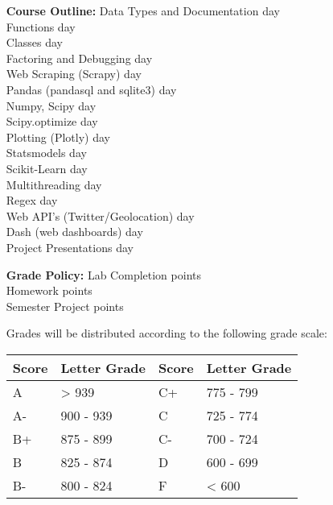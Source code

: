\documentclass[12pt, margin=.5in]{article}
\begin{document}
\begin{itemize}
\vspace*{.15in}
\item[\textbf{Course Outline:}]
Data Types and Documentation  day\\
Functions  day\\
Classes  day\\
Factoring and Debugging  day\\
Web Scraping (Scrapy)  day\\
Pandas (pandasql and sqlite3)  day\\
Numpy, Scipy  day\\
Scipy.optimize  day\\
Plotting (Plotly)  day\\
Statsmodels  day\\
Scikit-Learn  day\\
Multithreading  day\\
Regex  day\\
Web API's (Twitter/Geolocation)  day\\
Dash (web dashboards)  day\\
Project Presentations  day\\





\vspace*{.15in}
\item[\textbf{Grade Policy:}] 
Lab Completion  points\\
Homework  points\\
Semester Project  points

\vspace*{1em}
Grades will be distributed according to the following grade scale: \\

\begin{tabular}{l|l|l|l}
Score & Letter Grade & Score & Letter Grade\\
\hline
A & > 939 & C+ & 775 - 799 \\
A- & 900 - 939 & C & 725 - 774 \\
B+ & 875 - 899 & C- & 700 - 724 \\
B & 825 - 874 & D & 600 - 699 \\
B- & 800 - 824 & F & < 600 \\
\end{tabular}



\end{itemize}
\end{document}
